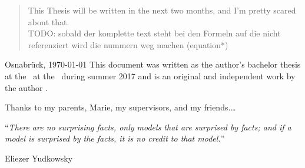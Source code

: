 \documentclass[11pt, oneside, english, singlespacing, %
headsepline, %
]{MastersDoctoralThesis}
\begin{document}
	
	\begin{abstract}
		\addchaptertocentry{\abstractname} %
		This Thesis will be written in the next two months, and I'm pretty scared about that.\\
		TODO: sobald der komplette text steht bei den Formeln auf die nicht referenziert wird die nummern weg machen (equation*)
	\end{abstract}


	\begin{preface}{\authorname}{Osnabrück, \today}
		\addchaptertocentry{\prefacename}
		\noindent This document was written as the author’s bachelor thesis at the \deptname~at the \univname~during summer 2017 and is an original and independent work by the author \authorname.
	\end{preface}



	
	
	\begin{acknowledgements}
		\addchaptertocentry{\acknowledgementname} %
		Thanks to my parents, Marie, my supervisors, and my friends.\ldots
	\end{acknowledgements}
	
	
	
	\newpage
	\vspace*{0.2\textheight}
	
	\noindent\enquote{\itshape There are no surprising facts, only models that are surprised by facts; and if a model is surprised by the facts, it is no credit to that model.}\bigbreak
	
	\hfill Eliezer Yudkowsky
\end{document}
